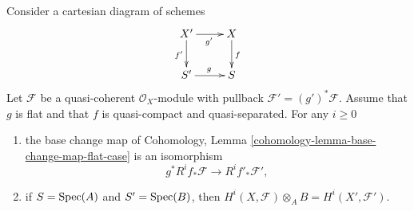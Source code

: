 \begin{lemma}
\label{lemma-flat-base-change-cohomology}
Consider a cartesian diagram of schemes
$$
\xymatrix{
X' \ar[d]_{f'} \ar[r]_{g'} & X \ar[d]^f \\
S' \ar[r]^g & S
}
$$
Let $\mathcal{F}$ be a quasi-coherent $\mathcal{O}_X$-module
with pullback $\mathcal{F}' = (g')^*\mathcal{F}$.
Assume that $g$ is flat and that $f$ is quasi-compact and quasi-separated.
For any $i \geq 0$
\begin{enumerate}
\item the base change map of
Cohomology, Lemma \ref{cohomology-lemma-base-change-map-flat-case}
is an isomorphism
$$
g^*R^if_*\mathcal{F} \longrightarrow R^if'_*\mathcal{F}',
$$
\item if $S = \mathop{\mathrm{Spec}}(A)$ and $S' = \mathop{\mathrm{Spec}}(B)$, then
$H^i(X, \mathcal{F}) \otimes_A B = H^i(X', \mathcal{F}')$.
\end{enumerate}
\end{lemma}

